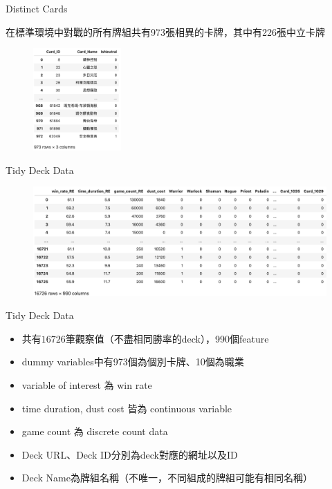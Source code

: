 \documentclass[12pt]{beamer}
\begin{document}
\begin{frame}[fragile]{Distinct Cards}

在標準環境中對戰的所有牌組共有973張相異的卡牌，其中有226張中立卡牌

	\begin{figure}
		\begin{center}
			\includegraphics[width=0.3\textwidth]{figure/f04.png}
		\end{center}
	\end{figure}

\end{frame}


\begin{frame}[fragile]{Tidy Deck Data}

	\begin{figure}
		\begin{center}
			\includegraphics[width=1\textwidth]{figure/f05.png}
		\end{center}
	\end{figure}

\end{frame}

\begin{frame}[fragile]{Tidy Deck Data}

	\begin{itemize}
		\item 共有$16726$筆觀察值（不盡相同勝率的deck），990個feature
		\item dummy variables中有973個為個別卡牌、10個為職業
		\item variable of interest 為 win rate
		\item time duration, dust cost 皆為 continuous variable
		\item game count 為 discrete count data
		\item Deck URL、Deck ID分別為deck對應的網址以及ID
		\item Deck Name為牌組名稱（不唯一，不同組成的牌組可能有相同名稱）
	\end{itemize}


\end{frame}
\end{document}
